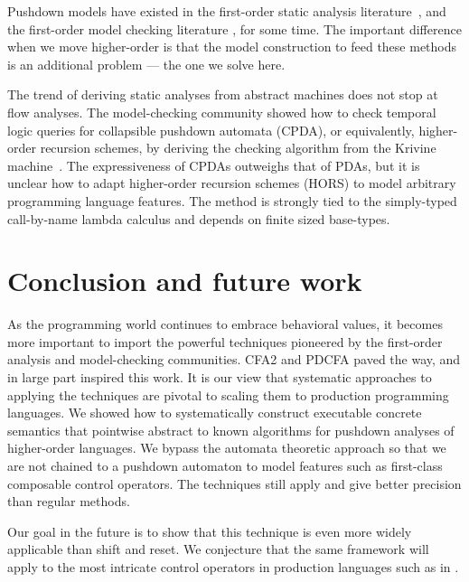 Pushdown models have existed in the first-order static analysis literature~\citep[Chapter 7]{local:muchnick:jones:flow-analysis:1981}\citep{ianjohnson:reps:pushdown:1995}, and the first-order model checking literature \citep{ianjohnson:bouajiani:esparza:pushdown:1997}, for some time.
%
The important difference when we move higher-order is that the model construction to feed these methods is an additional problem --- the one we solve here.

The trend of deriving static analyses from abstract machines does not stop at flow analyses.
%
The model-checking community showed how to check temporal logic queries for collapsible pushdown automata (CPDA), or equivalently, higher-order recursion schemes, by deriving the checking algorithm from the Krivine machine~\citep{ianjohnson:Salvati:2011:KMH:2027223.2027239}.
%
The expressiveness of CPDAs outweighs that of PDAs, but it is unclear how to adapt higher-order recursion schemes (HORS) to model arbitrary programming language features.
%
The method is strongly tied to the simply-typed call-by-name lambda calculus and depends on finite sized base-types.
%

\section{Conclusion and future work}

As the programming world continues to embrace behavioral values, it becomes more important to import the powerful techniques pioneered by the first-order analysis and model-checking communities.
%
CFA2 and PDCFA paved the way, and in large part inspired this work.
%
It is our view that systematic approaches to applying the techniques are pivotal to scaling them to production programming languages.
%
We showed how to systematically construct executable concrete semantics that pointwise abstract to known algorithms for pushdown analyses of higher-order languages.
%
We bypass the automata theoretic approach so that we are not chained to a pushdown automaton to model features such as first-class composable control operators.
%
The techniques still apply and give better precision than regular methods.

Our goal in the future is to show that this technique is even more widely applicable than shift and reset.
%
We conjecture that the same framework will apply to the most intricate control operators in production languages such as in \citet{ianjohnson:Flatt:2007:ADC:1291151.1291178}.
%

